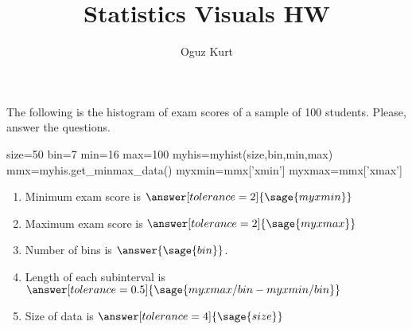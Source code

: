 \documentclass{ximera}
\title{Statistics Visuals HW}
\author{Oguz Kurt}
\begin{document}
\begin{abstract}
\empty
\end{abstract}
\maketitle

\begin{problem}
The following is the histogram of exam scores of a sample of 100 students. Please, answer the questions.

\begin{sagesilent}
size=50
bin=7
min=16
max=100
myhis=myhist(size,bin,min,max)
mmx=myhis.get_minmax_data()
myxmin=mmx['xmin']    
myxmax=mmx['xmax']    
\end{sagesilent}


\begin{enumerate}
    \item Minimum exam score is $\answer[tolerance=2]{\sage{myxmin}}$
    \item Maximum exam score is $\answer[tolerance=2]{\sage{myxmax}}$
    \item Number of bins is $\answer{\sage{bin}}$.
    \item Length of each subinterval is $\answer[tolerance=0.5]{\sage{myxmax/bin-myxmin/bin}}$
    \item Size of data is $\answer[tolerance=4]{\sage{size}}$
\end{enumerate}
\end{problem}
\end{document}
